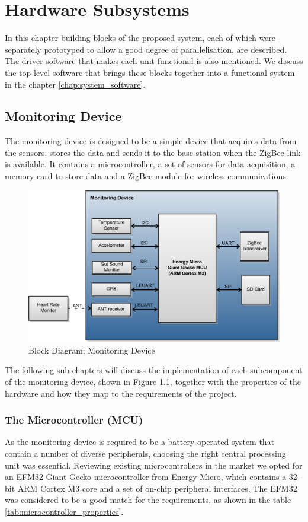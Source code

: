 \chapter{Hardware Subsystems}
\label{chap:hardware_subsystems}
In this chapter building blocks of the proposed system, each of which were separately prototyped to allow a good degree of parallelisation, are described. The driver software that makes each unit functional is also mentioned. We discuss the top-level software that brings these blocks together into a functional system in the chapter \ref{chap:system_software}.

\section{Monitoring Device}
The monitoring device is designed to be a simple device that acquires data from the sensors, stores the data and sends it to the base station when the ZigBee link is available. It contains a microcontroller, a set of sensors for data acquisition, a memory card to store data and a ZigBee module for wireless communications.

\begin{figure}[htb]
\includegraphics[width=\textwidth]{Images/MonitoringDeviceBlockDiagram}
\caption{Block Diagram: Monitoring Device}
\label{fig:monitoring_device_block}
\end{figure}

The following sub-chapters will discuss the implementation of each subcomponent of the monitoring device, shown in Figure \ref{fig:monitoring_device_block}, together with the properties of the hardware and how they map to the requirements of the project.


\subsection{The Microcontroller (MCU)}
As the monitoring device is required to be a battery-operated system that contain a number of diverse peripherals, choosing the right central processing unit was essential. Reviewing existing microcontrollers in the market we opted for an EFM32 Giant Gecko microcontroller from Energy Micro, which contains a 32-bit ARM Cortex M3 core and a set of on-chip peripheral interfaces. The EFM32 was considered to be a good match for the requirements, as shown in the table \ref{tab:microcontroller_properties}.


